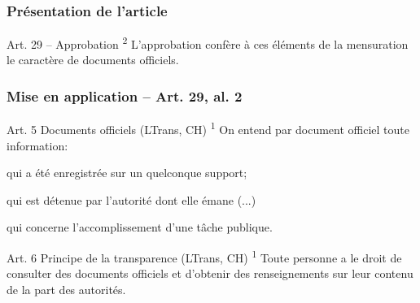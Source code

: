 \documentclass{beamer}
\renewcommand{\up}[1]{\textsuperscript{#1}}
\begin{document}
\begin{frame}
    \frametitle{Présentation de l'article}
    \begin{alertblock}{Art. 29 -- Approbation}
        \up{2} L’approbation confère à ces \alert{éléments de la mensuration} le caractère de \alert{documents officiels}.
    \end{alertblock}
\end{frame}

\begin{frame}
    \frametitle{Mise en application -- Art. 29, al. 2}
    \begin{exampleblock}{Art. 5 Documents officiels (LTrans, CH)}
        \up{1} On entend par document officiel toute information:
        \begin{outline}
            \item qui a été enregistrée sur un quelconque support;
            \item qui est détenue par l'autorité dont elle émane (...)
            \item qui concerne l'accomplissement d'une tâche publique.
        \end{outline}
    \end{exampleblock}
    \bigskip \pause
    \begin{exampleblock}{Art. 6 Principe de la transparence (LTrans, CH)}
        \up{1} Toute personne a le droit de consulter des documents officiels et d’obtenir des renseignements sur leur contenu de la part des autorités.
    \end{exampleblock}
\end{frame}
\end{document}
